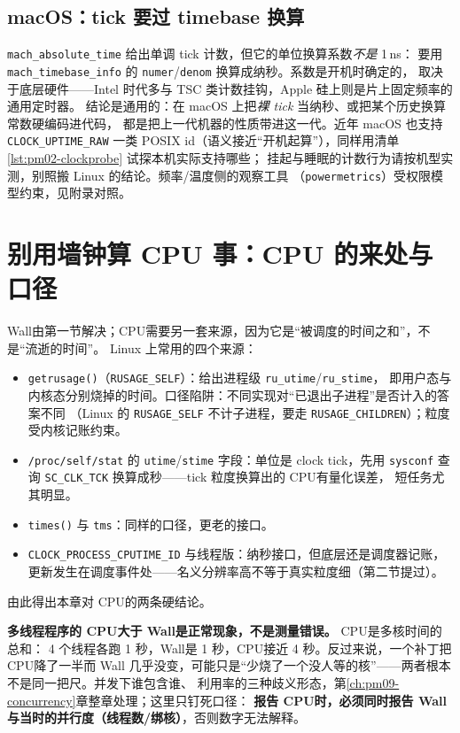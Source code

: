 \documentclass[12pt,a4paper,fontset=fandol]{ctexbook}
\newcommand{\Fn}[1]{\texttt{#1()}}
\newcommand{\Tp}[1]{\texttt{#1}}
\newcommand{\Bk}{\discretionary{}{}{}}
\newcommand{\Lang}[1]{\textsf{#1}}
\newcommand{\MWall}{\Lang{Wall}}
\newcommand{\MCpu}{\Lang{CPU}}
\begin{document}
\subsection{macOS：tick 要过 timebase 换算}
\label{sub:pm02-macos}

\Tp{mach{\Bk}\_absolute{\Bk}\_time} 给出单调 tick 计数，但它的单位换算系数\emph{不是} 1\,ns：
要用 \Tp{mach{\Bk}\_timebase{\Bk}\_info} 的 \Tp{numer}/\Tp{denom} 换算成纳秒。系数是开机时确定的，
取决于底层硬件——Intel 时代多与 TSC 类计数挂钩，Apple 硅上则是片上固定频率的通用定时器。
结论是通用的：在 macOS 上把\emph{裸 tick} 当纳秒、或把某个历史换算常数硬编码进代码，
都是把上一代机器的性质带进这一代。近年 macOS 也支持 \Tp{CLOCK{\Bk}\_UPTIME{\Bk}\_RAW}
一类 POSIX id（语义接近``开机起算''），同样用清单 \ref{lst:pm02-clockprobe} 试探本机实际支持哪些；
挂起与睡眠的计数行为请按机型实测，别照搬 Linux 的结论。频率/温度侧的观察工具
（\Tp{powermetrics}）受权限模型约束，见附录对照。

\section{别用墙钟算 CPU 事：\MCpu{} 的来处与口径}
\label{sec:pm02-cputime}

\MWall 由第一节解决；\MCpu 需要另一套来源，因为它是``被调度的时间之和''，不是``流逝的时间''。
Linux 上常用的四个来源：

\begin{itemize}
\item \Fn{getrusage}（\Tp{RUSAGE{\Bk}\_SELF}）：给出进程级 \Tp{ru{\Bk}\_utime}/\Tp{ru{\Bk}\_stime}，
即用户态与内核态分别烧掉的时间。口径陷阱：不同实现对``已退出子进程''是否计入的答案不同
（Linux 的 \Tp{RUSAGE{\Bk}\_SELF} 不计子进程，要走 \Tp{RUSAGE{\Bk}\_CHILDREN}）；粒度受内核记账约束。
\item \Tp{/proc{\Bk}/self{\Bk}/stat} 的 \Tp{utime}/\Tp{stime} 字段：单位是 clock tick，先用
\Tp{sysconf} 查询 \Tp{SC{\Bk}\_CLK{\Bk}\_TCK} 换算成秒——tick 粒度换算出的 \MCpu 有量化误差，
短任务尤其明显。
\item \Fn{times} 与 \Tp{tms}：同样的口径，更老的接口。
\item \Tp{CLOCK{\Bk}\_PROCESS{\Bk}\_CPUTIME{\Bk}\_ID} 与线程版：纳秒接口，但底层还是调度器记账，
更新发生在调度事件处——名义分辨率高不等于真实粒度细（第二节提过）。
\end{itemize}

由此得出本章对 \MCpu 的两条硬结论。

\textbf{多线程程序的 \MCpu 大于 \MWall 是正常现象，不是测量错误。} \MCpu 是多核时间的总和：
4 个线程各跑 1 秒，\MWall 是 1 秒，\MCpu 接近 4 秒。反过来说，一个补丁把 \MCpu 降了一半而 \MWall
几乎没变，可能只是``少烧了一个没人等的核''——两者根本不是同一把尺。并发下谁包含谁、
利用率的三种歧义形态，第\ref{ch:pm09-concurrency}章整章处理；这里只钉死口径：
\textbf{报告 \MCpu 时，必须同时报告 \MWall 与当时的并行度（线程数/绑核）}，否则数字无法解释。
\end{document}
